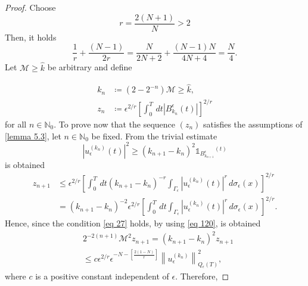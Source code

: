 \begin{proof} Choose
$$
    r=\frac{2(N+1)}{N}>2
$$
Then, it holds
\begin{equation}
    \frac{1}{r}+\frac{(N-1)}{2 r}=\frac{N}{2N+2}+\frac{(N-1)N}{4N+4}=\frac{N}{4}.
\label{eq 27}
\end{equation}
Let $\mathcal{M} \geq \hat{k}$ be arbitrary and define


\begin{align}
    k_{n} &\coloneqq \left(2-2^{-n}\right) \mathcal{M} \geq \hat{k},  \nonumber \\
    z_{n} &\coloneqq \epsilon^{2 / r}\left[\int_{0}^{T} \, d  t\left|B_{k_{n}}^{\epsilon}(t)\right|\right]^{2 / r}
\label{eq 28}
\end{align}
for all $n \in \mathbb{N}_{0}$. To prove now that the sequence $\left(z_{n}\right)$ satisfies the assumptions of \eqref{lemma 5.3}, let $n \in \mathbb{N}_{0}$ be fixed. From the trivial estimate
\begin{equation}
 \left|u_{\epsilon}^{\left(k_{n}\right)}(t)\right|^{2} \geq\left(k_{n+1}-k_{n}\right)^{2} \mathds{1}_{B_{k_{n+1}}^{\epsilon}}{ }^{(t)}
\label{eq 29}\end{equation}
is obtained
\begin{equation}
    \begin{aligned}
        z_{n+1} & \leq \epsilon^{2 / r}\left[\int_{0}^{T} \, d  t\left(k_{n+1}-k_{n}\right)^{-r} \int_{\Gamma_{\epsilon}}\left|u_{\epsilon}^{\left(k_{n}\right)}(t)\right|^{r} \, d  \sigma_{\epsilon}(x)\right]^{2 / r} \\
        &=\left(k_{n+1}-k_{n}\right)^{-2} \epsilon^{2 / r}\left[\int_{0}^{T} \, d  t \int_{\Gamma_{\epsilon}}\left|u_{\epsilon}^{\left(k_{n}\right)}(t)\right|^{r} \, d  \sigma_{\epsilon}(x)\right]^{2 / r}.
    \end{aligned}
\label{eq 30}
\end{equation}
Hence, since the condition \eqref{eq 27} holds, by using \eqref{eq 120}, is obtained
\begin{equation}
    \begin{aligned}
        &2^{-2(n+1)} \mathcal{M}^{2} z_{n+1}=\left(k_{n+1}-k_{n}\right)^{2} z_{n+1} \\
        &\leq c \epsilon^{2 / r} \epsilon^{-N-\left[\frac{2(1-N)}{r}\right]}\left\|u_{\epsilon}^{\left(k_{n}\right)}\right\|_{Q_{\epsilon}(T)}^{2},
    \end{aligned}
\label{eq 31}
\end{equation}
where $c$ is a positive constant independent of $\epsilon$. Therefore,

\end{proof}
